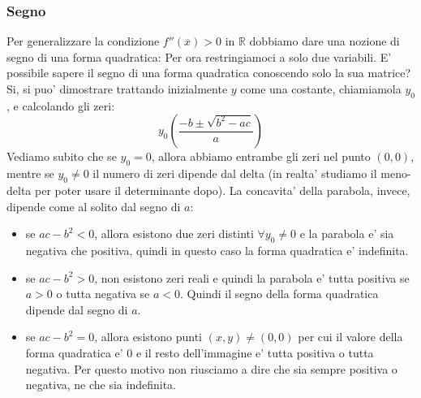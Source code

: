 \documentclass{report}
\begin{document}
\subsubsection{Segno}
Per generalizzare la condizione $ f''(\overline{x})> 0 $ in $ \mathbb{R} $ dobbiamo dare una nozione di segno di una forma quadratica:
Per ora restringiamoci a solo due variabili. E' possibile sapere il segno di una forma quadratica conoscendo solo la sua matrice? Si, si puo' dimostrare trattando inizialmente $ y $ come una costante, chiamiamola $ y_0 $, e calcolando gli zeri:
\[
  y_0\left(\frac{-b \pm \sqrt{b^2-ac}}{a}\right)
\]
Vediamo subito che se $ y_0 = 0 $, allora abbiamo entrambe gli zeri nel punto $ (0,0) $, mentre se $ y_0 \neq 0 $ il numero di zeri dipende dal delta (in realta' studiamo il meno-delta per poter usare il determinante dopo). La concavita' della parabola, invece, dipende come al solito dal segno di $ a $:
\begin{itemize}
  \item se $ ac-b^2 < 0 $, allora esistono due zeri distinti $ \forall y_0 \neq 0 $ e la parabola e' sia negativa che positiva, quindi in questo caso la forma quadratica e' indefinita.
  \item se $ ac-b^2 > 0 $, non esistono zeri reali e quindi la parabola e' tutta positiva se $ a>0 $ o tutta negativa se $ a < 0 $. Quindi il segno della forma quadratica dipende dal segno di $ a $.
  \item se $ ac-b^2 = 0 $, allora esistono punti $ (x,y) \neq (0,0) $ per cui il valore della forma quadratica e' $ 0 $ e il resto dell'immagine e' tutta positiva o tutta negativa. Per questo motivo non riusciamo a dire che sia sempre positiva o negativa, ne che sia indefinita.

\end{itemize}
\end{document}
